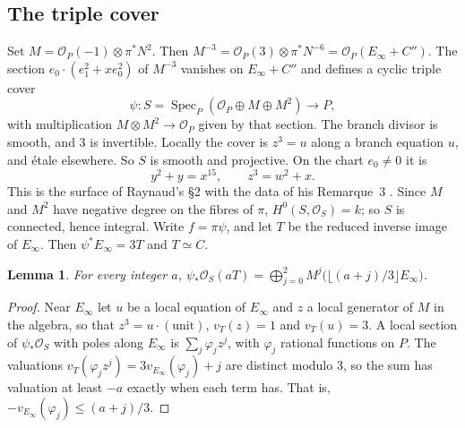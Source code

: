 \documentclass[11pt,a4paper]{article}
\theoremstyle{plain}
\newtheorem{lemma}[theorem]{Lemma}
\theoremstyle{remark}
\newcommand{\OO}{\mathcal O}
\newcommand{\Spec}{\operatorname{Spec}}
\begin{document}
\subsection{The triple cover}
Set $M=\OO_P(-1)\otimes\pi^*N^2$. Then $M^{-3}=\OO_P(3)\otimes\pi^*N^{-6}=\OO_P(E_\infty+C'')$. The section $e_0\cdot(e_1^2+xe_0^2)$ of
$M^{-3}$ vanishes on $E_\infty+C''$ and defines a cyclic triple cover
\[
 \psi:S=\Spec_P(\OO_P\oplus M\oplus M^2)\longrightarrow P,
\]
with multiplication $M\otimes M^2\to\OO_P$ given by that section. The branch divisor is smooth, and $3$ is invertible.
Locally the cover is $z^3=u$ along a branch equation $u$, and étale elsewhere. So $S$ is smooth and projective. On the
chart $e_0\ne0$ it is
\[
 y^2+y=x^{15},\qquad z^3=w^2+x .
\]
This is the surface of Raynaud's \S2 with the data of his Remarque~3 \cite[pp.~275--278]{Raynaud}. Since $M$ and $M^2$ have negative degree on the
fibres of $\pi$, $H^0(S,\OO_S)=k$; so $S$ is connected, hence integral. Write $f=\pi\psi$, and let $T$ be the reduced
inverse image of $E_\infty$. Then $\psi^*E_\infty=3T$ and $T\simeq C$.

\begin{lemma}\label{lem:floor}
For every integer $a$,
$\displaystyle\psi_*\OO_S(aT)=\bigoplus_{j=0}^2M^j\bigl(\lfloor (a+j)/3\rfloor E_\infty\bigr)$.
\end{lemma}
\begin{proof}
Near $E_\infty$ let $u$ be a local equation of $E_\infty$ and $z$ a local generator of $M$ in the algebra, so that
$z^3=u\cdot(\text{unit})$, $v_T(z)=1$ and $v_T(u)=3$. A local section of $\psi_*\OO_S$ with poles along $E_\infty$ is
$\sum_j\varphi_jz^j$, with $\varphi_j$ rational functions on $P$. The valuations $v_T(\varphi_jz^j)=3v_{E_\infty}(\varphi_j)+j$
are distinct modulo $3$, so the sum has valuation at least $-a$ exactly when each term has. That is,
$-v_{E_\infty}(\varphi_j)\le(a+j)/3$.
\end{proof}
\end{document}
